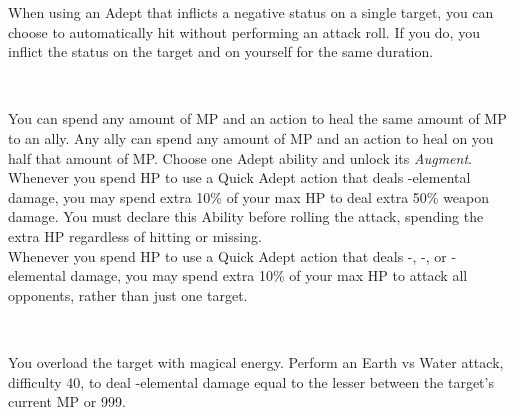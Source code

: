 \begin{tabjob}
         When using an Adept  that inflicts a negative status on a single target, you can choose to automatically hit without performing an attack roll. If you do, you inflict the status on the target and on yourself for the same duration. \\

    \tabjobsep%

    \\
    \tabjobspec{}

         You can spend any amount of MP and an action to heal the same amount of MP to an ally. Any ally can spend any amount of MP and an action to heal on you half that amount of MP\@. Choose one Adept ability and unlock its \textit{Augment}. \\

         Whenever you spend HP to use a Quick Adept action that deals -elemental damage, you may spend extra 10\% of your max HP to deal extra 50\% weapon damage. You must declare this Ability before rolling the attack, spending the extra HP regardless of hitting or missing. \\

         Whenever you spend HP to use a Quick Adept action that deals -, -, or -elemental damage, you may spend extra 10\% of your max HP to attack all opponents, rather than just one target. \\

    \tabjobsep%

     \\
    \tabjobspec{}

         You overload the target with magical energy. Perform an Earth vs Water attack, difficulty 40, to deal -elemental damage equal to the lesser between the target's current MP or 999. \\


\end{tabjob}
